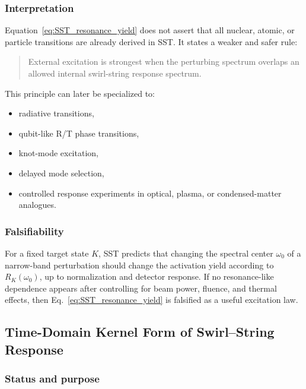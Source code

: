     \subsubsection*{Interpretation}
        
        Equation~\eqref{eq:SST_resonance_yield} does not assert that all nuclear, atomic, or particle transitions are already derived in SST. It states a weaker and safer rule:
        
        \begin{quote}
            External excitation is strongest when the perturbing spectrum overlaps an allowed internal swirl-string response spectrum.
        \end{quote}
        
        This principle can later be specialized to:
        \begin{itemize}
            \item radiative transitions,
            \item qubit-like R/T phase transitions,
            \item knot-mode excitation,
            \item delayed mode selection,
            \item controlled response experiments in optical, plasma, or condensed-matter analogues.
        \end{itemize}
    
    \subsubsection*{Falsifiability}
        
        For a fixed target state \(K\), SST predicts that changing the spectral center \(\omega_0\) of a narrow-band perturbation should change the activation yield according to \(R_K(\omega_0)\), up to normalization and detector response. If no resonance-like dependence appears after controlling for beam power, fluence, and thermal effects, then Eq.~\eqref{eq:SST_resonance_yield} is falsified as a useful excitation law.

\subsection{Time-Domain Kernel Form of Swirl--String Response}
    \label{app:time-domain-kernel-response}
    
    \subsubsection*{Status and purpose}
        
